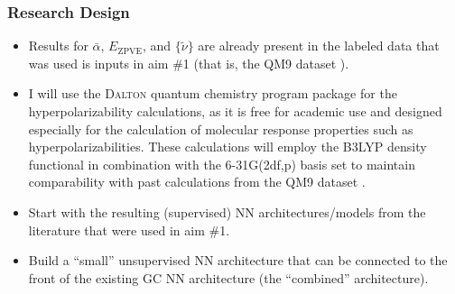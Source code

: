 \documentclass[12pt]{article}
\begin{document}
\subsubsection{Research Design}
\label{sec:org4b1ad5b}

\begin{itemize}
\item Results for \(\bar{\alpha}\), \(E_{\text{ZPVE}}\), and \(\{\tilde{\nu}\}\) are already present in the labeled data that was used is inputs in aim \#1 (that is, the QM9 dataset \cite{Ramakrishnan:2014ij}).

\item I will use the \textsc{Dalton} quantum chemistry program package \cite{daltonpaper} for the hyperpolarizability calculations, as it is free for academic use and designed especially for the calculation of molecular response properties such as hyperpolarizabilities. These calculations will employ the B3LYP density functional in combination with the 6-31G(2df,p) basis set to maintain comparability with past calculations from the QM9 dataset \cite{Ramakrishnan:2014ij}.

\item Start with the resulting (supervised) NN architectures/models from the literature that were used in aim \#1.

\item Build a ``small'' unsupervised NN architecture that can be connected to the front of the existing GC NN architecture (the ``combined'' architecture).
\end{itemize}
\end{document}
